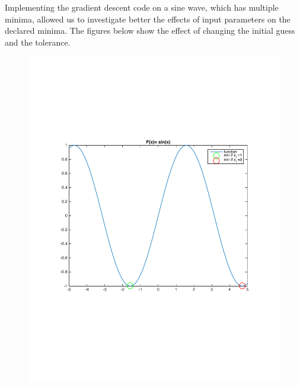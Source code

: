 \documentclass{article}
\begin{document}
Implementing the gradient descent code on a sine wave, which has multiple minima,  allowed us to investigate better the effects of input parameters on the declared minima. The figures below show the effect of changing the initial guess and the tolerance. 
\begin{figure}[H]
\begin{minipage}{.3\textwidth}
\center
\includegraphics[scale=.25]{1Dsin.pdf}
	

\end{minipage}
\end{figure}
\end{document}
